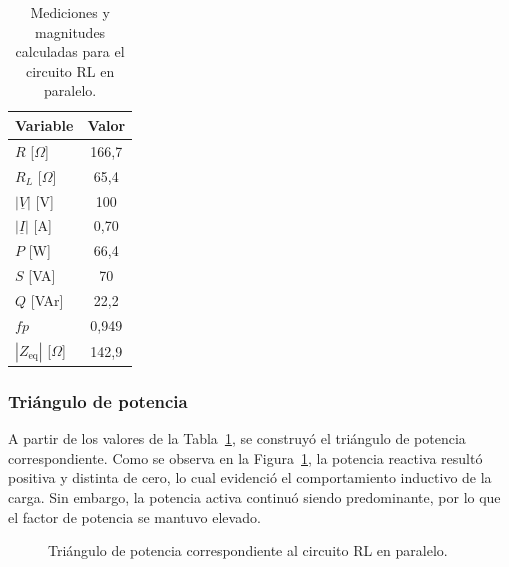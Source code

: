 \begin{table}[H]
    \centering
    \caption{Mediciones y magnitudes calculadas para el circuito RL en paralelo.}
    \label{tab:tp3_paso2}
    \begin{tabular}{lc}
        \toprule
        Variable & Valor \\
        \midrule
        $R$ [$\Omega$] & 166,7 \\
        $R_L$ [$\Omega$] & 65,4 \\
        $|\underline{V}|$ [V] & 100 \\
        $|\underline{I}|$ [A] & 0,70 \\
        $P$ [W] & 66,4 \\
        $S$ [VA] & 70 \\
        $Q$ [VAr] & 22,2 \\
        $fp$ & 0,949 \\
        $|Z_{\text{eq}}|$ [$\Omega$] & 142,9 \\
        \bottomrule
    \end{tabular}
\end{table}


\subsubsection{Triángulo de potencia}

A partir de los valores de la Tabla~\ref{tab:tp3_paso2}, se construyó el triángulo de potencia correspondiente. Como se observa en la Figura~\ref{fig:triangulo_rl}, la potencia reactiva resultó positiva y distinta de cero, lo cual evidenció el comportamiento inductivo de la carga. Sin embargo, la potencia activa continuó siendo predominante, por lo que el factor de potencia se mantuvo elevado.

\begin{figure}[H]
    \centering
    \caption{Triángulo de potencia correspondiente al circuito RL en paralelo.}
    \label{fig:triangulo_rl}
\end{figure}

